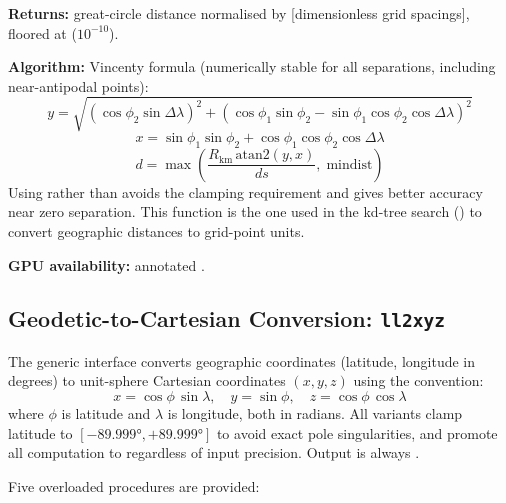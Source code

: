 \textbf{Returns:} great-circle distance normalised by 
[dimensionless grid spacings], floored at  ($10^{-10}$).

\textbf{Algorithm:} Vincenty formula (numerically stable for all
separations, including near-antipodal points):
\[
  y = \sqrt{(\cos\phi_2\sin\Delta\lambda)^2 +
            (\cos\phi_1\sin\phi_2 - \sin\phi_1\cos\phi_2\cos\Delta\lambda)^2}
\]
\[
  x = \sin\phi_1\sin\phi_2 + \cos\phi_1\cos\phi_2\cos\Delta\lambda
\]
\[
  d = \max\!\left(\frac{R_\text{km}\,\text{atan2}(y,x)}{ds},\;
                  \text{mindist}\right)
\]
Using  rather than  avoids the clamping requirement
and gives better accuracy near zero separation. This function is the one
used in the kd-tree search () to convert geographic
distances to grid-point units.

\textbf{GPU availability:} annotated .

\subsection{Geodetic-to-Cartesian Conversion: \texttt{ll2xyz}}
\label{subsec:earth_ll2xyz}

The generic interface  converts geographic coordinates
(latitude, longitude in degrees) to unit-sphere Cartesian coordinates
$(x, y, z)$ using the convention:
\[
  x = \cos\phi\,\sin\lambda, \quad
  y = \sin\phi, \quad
  z = \cos\phi\,\cos\lambda
\]
where $\phi$ is latitude and $\lambda$ is longitude, both in radians.
All variants clamp latitude to $[-89.999°, +89.999°]$ to avoid exact pole
singularities, and promote all computation to  regardless of
input precision. Output is always .

Five overloaded procedures are provided:

